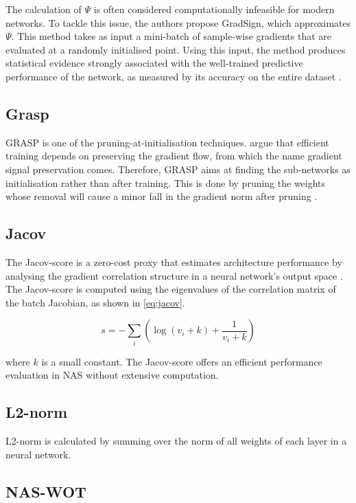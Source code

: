 The calculation of $\Psi$ is often considered computationally infeasible for modern networks. To tackle this issue, the authors propose GradSign, which approximates $\Psi$. This method takes as input a mini-batch of sample-wise gradients that are evaluated at a randomly initialised point. Using this input, the method produces statistical evidence strongly associated with the well-trained predictive performance of the network, as measured by its accuracy on the entire dataset \autocite{zhang2021gradsign}. 


\subsection{Grasp}
\gls{GRASP} is one of the pruning-at-initialisation techniques. \cite{wang2020picking} argue that efficient training depends on preserving the gradient flow, from which the name gradient signal preservation comes. Therefore, \gls{GRASP} aims at finding the sub-networks as initialisation rather than after training. This is done by pruning the weights whose removal will cause a minor fall in the gradient norm after pruning \autocite{wang2020picking}. 


\subsection{Jacov}
The Jacov-score is a zero-cost proxy that estimates architecture performance by analysing the gradient correlation structure in a neural network's output space \autocite{jacob_conv}. The Jacov-score is computed using the eigenvalues of the correlation matrix of the batch Jacobian, as shown in \cref{eq:jacov}. 

\begin{equation}
    s =-\sum_i \left( \log(v_i+k)+\frac{1}{v_i+k}\right)
\label{eq:jacov}
\end{equation}

where $k$ is a small constant. The Jacov-score offers an efficient performance evaluation in \gls{NAS} without extensive computation.

\subsection{L2-norm}
L2-norm is calculated by summing over the norm of all weights of each layer in a neural network. 


\subsection{NAS-WOT}

